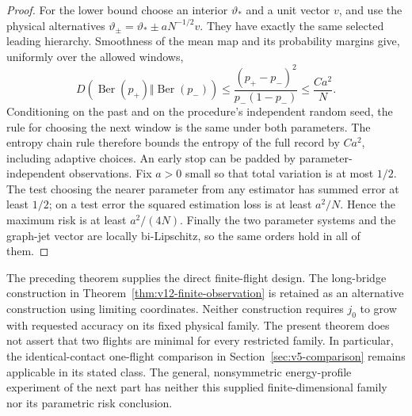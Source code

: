 \begin{proof}
For the lower bound choose an interior $\vartheta_*$ and a unit
vector $v$, and use the physical alternatives
$\vartheta_\pm=\vartheta_*\pm aN^{-1/2}v$. They have exactly
the same selected leading hierarchy. Smoothness of the mean map and
its probability margins give, uniformly over the allowed windows,
\[
 D(\operatorname{Ber}(p_+)\Vert\operatorname{Ber}(p_-))
 \le\frac{(p_+-p_-)^2}{p_-(1-p_-)}\le\frac{Ca^2}{N}.
\]
Conditioning on the past and on the procedure's independent random
seed, the rule for choosing the next window is the same under both
parameters. The entropy chain rule therefore bounds the entropy of
the full record by $Ca^2$, including adaptive choices. An early stop
can be padded by parameter-independent observations. Fix $a>0$ small
so that total variation is at most $1/2$. The test choosing the nearer
parameter from any estimator has summed error at least $1/2$; on a
test error the squared estimation loss is at least $a^2/N$. Hence
the maximum risk is at least $a^2/(4N)$. Finally the two parameter
systems and the graph-jet vector are locally bi-Lipschitz, so the same
orders hold in all of them.
\end{proof}

The preceding theorem supplies the direct finite-flight design. The
long-bridge construction in Theorem~\ref{thm:v12-finite-observation}
is retained as an alternative construction using limiting coordinates.
Neither construction requires $j_0$ to grow with requested accuracy
on its fixed physical family. The present theorem does not assert
that two flights are minimal for every restricted family. In particular,
the identical-contact one-flight comparison in
Section~\ref{sec:v5-comparison} remains applicable in its stated class.
The general, nonsymmetric energy-profile experiment of the next part
has neither this supplied finite-dimensional family nor its parametric
risk conclusion.
